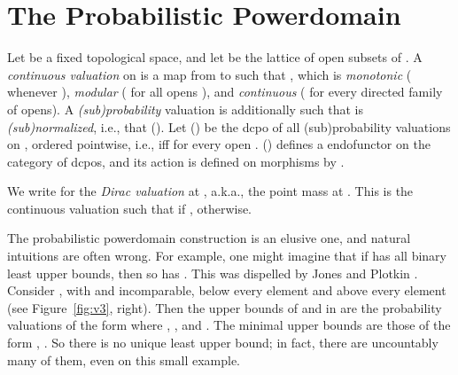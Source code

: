 \documentclass{LMCS}
\begin{document}
\section{The Probabilistic Powerdomain}
\label{sec:qretr:V}

Let  be a fixed topological space, and let  be the
lattice of open subsets of .
A {\em continuous valuation\/}  on  \cite{JP:proba} is a map
from  to  such that , which is
{\em monotonic\/} ( whenever ),
{\em modular\/} (
for all opens ), and {\em continuous\/} ( for every directed
family  of opens).  A {\em (sub)probability\/}
valuation  is additionally such that  is {\em
  (sub)normalized\/}, i.e., that  ().  Let
 () be the dcpo of all (sub)probability
valuations on , ordered pointwise, i.e.,  iff  for every open .   ()
defines a endofunctor on the category of dcpos, and its action is
defined on morphisms  by .

We write  for the \emph{Dirac valuation} at , a.k.a., the
point mass at .  This is the continuous valuation such that
 if ,  otherwise.

The probabilistic powerdomain construction  is an elusive one,
and natural intuitions are often wrong.  For example, one might
imagine that if  has all binary least upper bounds, then so has
.  This was dispelled by Jones and Plotkin
\cite{JP:proba}.  Consider , with  and
 incomparable,  below every element and  above every
element (see Figure~\ref{fig:v3}, right).  Then the upper bounds of
 and  in  are the probability
valuations of the form  where , , and .  The minimal upper bounds are those of the form , .  So there is no
unique least upper bound; in fact, there are uncountably many of them,
even on this small example.
\end{document}

